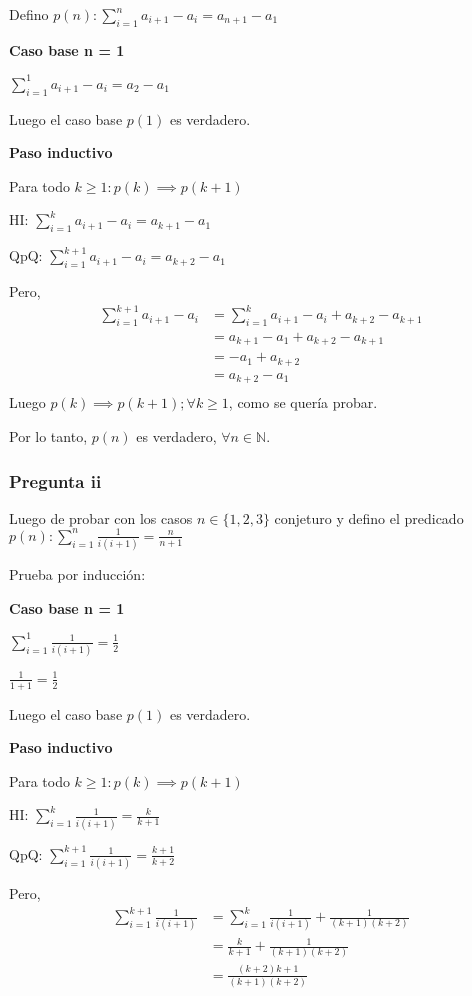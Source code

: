 Defino $p(n) : \sum_{i=1}^{n}a_{i+1}-a_i = a_{n+1} - a_1$

\textbf{Caso base n = 1}

$\sum_{i=1}^{1}a_{i+1}-a_i = a_2 - a_1$

Luego el caso base $p(1)$ es verdadero.

\textbf{Paso inductivo}

Para todo $k \geq 1: p(k) \implies p(k+1)$

HI: $\sum_{i=1}^{k}a_{i+1}-a_i = a_{k+1} - a_1$

QpQ: $\sum_{i=1}^{k+1}a_{i+1}-a_i = a_{k+2} - a_1$

Pero,
\begin{align*}
    \sum_{i=1}^{k+1}a_{i+1}-a_i &= \sum_{i=1}^{k}a_{i+1}-a_i + a_{k+2} - a_{k+1} \\
    &= a_{k+1} - a_1 + a_{k+2} - a_{k+1} \\
    &= - a_1 + a_{k+2} \\
    &= a_{k+2} - a_1 \\
\end{align*}
Luego $p(k) \implies p(k+1); \forall k \geq 1$, como se quería probar.

Por lo tanto, $p(n)$ es verdadero, $\forall n \in \mathbb{N}$.

\subsubsection{Pregunta ii}

Luego de probar con los casos $n \in \{ 1,2,3 \}$ conjeturo y defino el predicado $p(n): \sum_{i=1}^{n}\frac{1}{i(i+1)} = \frac{n}{n+1}$

Prueba por inducción:

\textbf{Caso base n = 1}

$\sum_{i=1}^{1}\frac{1}{i(i+1)} = \frac{1}{2}$

$ \frac{1}{1+1} = \frac{1}{2} $

Luego el caso base $p(1)$ es verdadero.

\textbf{Paso inductivo}

Para todo $k \geq 1: p(k) \implies p(k+1)$

HI: $\sum_{i=1}^{k}\frac{1}{i(i+1)} = \frac{k}{k+1}$

QpQ: $\sum_{i=1}^{k+1}\frac{1}{i(i+1)} = \frac{k+1}{k+2}$

Pero,
\begin{align*}
    \sum_{i=1}^{k+1}\frac{1}{i(i+1)} &= \sum_{i=1}^{k}\frac{1}{i(i+1)} + \frac{1}{(k+1)(k+2)} \\
    &= \frac{k}{k+1} + \frac{1}{(k+1)(k+2)} \\
    &= \frac{(k+2)k + 1}{(k+1)(k+2)}
\end{align*}

